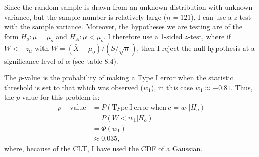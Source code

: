 \begin{problem}{19}  Since the random sample is drawn from an unknown distribution with unknown variance, but the sample number is relatively large ($n=121$), I can use a $z$-test with the sample variance.  Moreover, the hypotheses we are testing are of the form $H_o: \mu = \mu_o$ and $H_A:\mu < \mu_o$.  I therefore use a 1-sided $z$-test, where if $W<-z_{\alpha}$ with $W = (\bar X - \mu_o)/(S/\sqrt{n})$, then I reject the null hypothesis at a significance level of $\alpha$ (see table 8.4).

The $p$-value is the probability of making a Type I error when the statistic threshold is set to that which was observed ($w_1$), in this case $w_1 \approx -0.81$.  Thus, the $p$-value for this problem is:
\begin{align*}
p-\mathrm{value} &= P(\mathrm{Type~I~error~when}~c=w_1|H_o) \\
&=P(W<w_1|H_o)\\
&=\Phi(w_1) \\
& \approx 0.035,
\end{align*}
where, because of the CLT, I have used the CDF of a Gaussian.

\end{problem}


